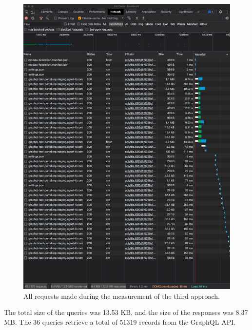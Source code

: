 \ifshowImages
\begin{figure}[H]
\centering
\includegraphics[width=0.7\linewidth]{images/results/1-attempt/shared-reduced-cache.png}
\caption{All requests made during the measurement of the third approach.}\label{fig:results:shared-cache-reduction}
\end{figure}
\fi

\noindent The total size of the queries was 13.53 KB, and the size of the responses was 8.37 MB. The 36 queries retrieve a total of 51319 records from the GraphQL \ac{API}.






